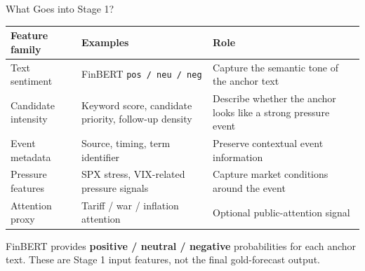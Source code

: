\begin{frame}{What Goes into Stage 1?}
  \scriptsize
  \begin{table}
    \centering
    \begin{tabular}{p{} p{} p{}}
      \toprule
      Feature family & Examples & Role \\
      \midrule
      Text sentiment & FinBERT \texttt{pos / neu / neg} & Capture the semantic tone of the anchor text \\
      Candidate intensity & Keyword score, candidate priority, follow-up density & Describe whether the anchor looks like a strong pressure event \\
      Event metadata & Source, timing, term identifier & Preserve contextual event information \\
      Pressure features & SPX stress, VIX-related pressure signals & Capture market conditions around the event \\
      Attention proxy & Tariff / war / inflation attention & Optional public-attention signal \\
      \bottomrule
    \end{tabular}
  \end{table}

  \vspace{0.4em}
  \small
  FinBERT provides \textbf{positive / neutral / negative} probabilities for each anchor text. These are Stage 1 input features, not the final gold-forecast output.
\end{frame}
